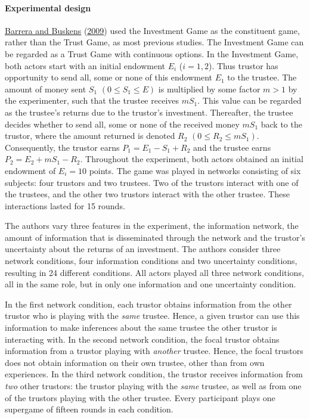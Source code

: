 \documentclass[
  11pt,
]{article}
\begin{document}
\hypertarget{experimental-design-7}{%
\paragraph{Experimental design}\label{experimental-design-7}}

\protect\hyperlink{ref-barrera_buskens_third_2009}{Barrera and Buskens} (\protect\hyperlink{ref-barrera_buskens_third_2009}{2009}) used the Investment Game as the constituent game, rather than the Trust Game, as most previous studies. The Investment Game can be regarded as a Trust Game with continuous options. In the Investment Game, both actors start with an initial endowment \(E_i\) (\(i = 1,2\)).
Thus trustor has opportunity to send all, some or none of this endowment \(E_1\) to the trustee. The amount of money sent \(S_1\) \((0 \leq S_1 \leq E)\) is multiplied by some factor \(m>1\) by the experimenter, such that the trustee receives \(mS_1\). This value can be regarded as the trustee's returns due to the trustor's investment.
Thereafter, the trustee decides whether to send all, some or none of the received money \(mS_1\) back to the trustor, where the amount returned is denoted \(R_2\) \((0 \leq R_2 \leq mS_1)\). Consequently, the trustor earns \(P_1 = E_1 - S_1 + R_2\) and the trustee earns \(P_2 = E_2 + mS_1 - R_2\).
Throughout the experiment, both actors obtained an initial endowment of \(E_i = 10\) points.
The game was played in networks consisting of six subjects: four trustors and two trustees. Two of the trustors interact with one of the trustees, and the other two trustors interact with the other trustee. These interactions lasted for 15 rounds.

The authors vary three features in the experiment, the information network, the amount of information that is disseminated through the network and the trustor's uncertainty about the returns of an investment. The authors consider three network conditions, four information conditions and two uncertainty conditions, resulting in 24 different conditions. All actors played all three network conditions, all in the same role, but in only one information and one uncertainty condition.

In the first network condition, each trustor obtains information from the other trustor who is playing with the \emph{same} trustee.
Hence, a given trustor can use this information to make inferences about the same trustee the other trustor is interacting with.
In the second network condition, the focal trustor obtains information from a trustor playing with \emph{another} trustee.
Hence, the focal trustors does not obtain information on their own trustee, other than from own experiences. In the third network condition, the trustor receives information from \emph{two} other trustors: the trustor playing with the \emph{same} trustee, as well as from one of the trustors playing with the other trustee. Every participant plays one supergame of fifteen rounds in each condition.
\end{document}
